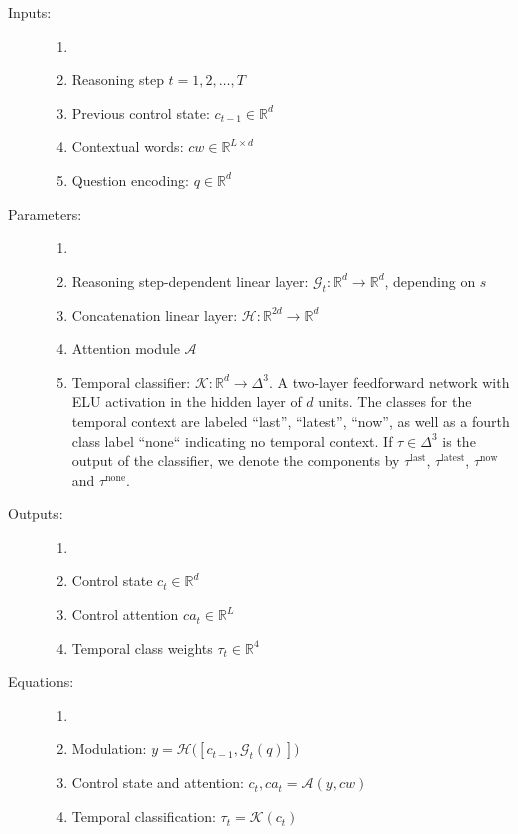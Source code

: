 \documentclass{article}
\theoremstyle{remark}
\theoremstyle{definition}
\newcommand{\Reals}{\mathbb{R}}
\newcommand{\cA}{\mathcal{A}}
\newcommand{\cG}{\mathcal{G}}
\newcommand{\cK}{\mathcal{K}}
\newcommand{\cH}{\mathcal{H}}
\newcommand{\tlast}{\tau^{\mathrm{last}}}
\newcommand{\tlatest}{\tau^{\mathrm{latest}}}
\newcommand{\tnow}{\tau^{\mathrm{now}}}
\newcommand{\tnone}{\tau^{\mathrm{none}}}
\begin{document}
\begin{description}
	\item[Inputs:] 
	\begin{enumerate}
		\item[]
		\item Reasoning step $t = 1,2, \dots, T$
		\item Previous control state: $c_{t-1} \in \Reals^d$	
		\item Contextual words: $cw \in \Reals^{L \times d}$
		\item Question encoding: $q \in \Reals^d$
	\end{enumerate}
	
	\item[Parameters:] 
	\begin{enumerate}
		\item[]
		\item Reasoning step-dependent linear layer: $\cG_t: \Reals^d \to \Reals^d$, depending on $s$
		\item Concatenation linear layer: $\cH: \Reals^{2d} \to \Reals^d$
		\item Attention module $\cA$
		\item Temporal classifier:  $\cK: \Reals^d \to \Delta^3$. A two-layer feedforward
		network with ELU activation in the hidden layer of $d$ units.	
		The classes for the temporal context are labeled ``last'', ``latest'', ``now'', as well as 
		a fourth class label ``none`` indicating no temporal context.
		If $\tau \in \Delta^3$ is the output of the classifier, we denote the components by
		$\tlast$, $\tlatest$, $\tnow$ and $\tnone$.
	\end{enumerate}
	
	\item[Outputs:] 
	\begin{enumerate}
		\item[]
		\item Control state $c_t \in \Reals^d$
		\item Control attention $ca_t \in \Reals^L$
		\item Temporal class weights $\tau_t \in \Reals^4$
    \end{enumerate}
	
	\item[Equations:] 
	\begin{enumerate}
		\item[]
		\item Modulation: $y = \cH\bigl([c_{t-1}, \cG_t(q)]\bigr)$
		\item Control state and attention: $c_t,  ca_t= \cA(y, cw)$
		\item Temporal classification: $\tau_t = \cK(c_t)$
\end{enumerate}
\end{description}
\end{document}
